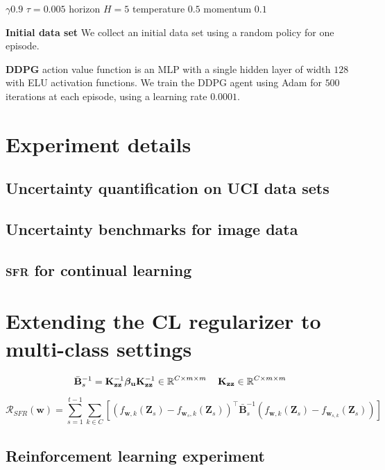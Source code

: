 \documentclass{article}
\newcommand{\our}{\textsc{sfr}\xspace}
\newcommand{\mathbold}[1]{\bm{#1}}
\newcommand{\mbf}[1]{\mathbf{#1}}
\newcommand{\MB}{\mbf{B}}
\newcommand{\MZ}{\mbf{Z}}
\newcommand{\T}{\top}
\newcommand{\vbeta}[0]{\mathbold{\beta}}
\newcommand{\vu}{\mbf{u}}
\newcommand{\vw}{\mbf{w}}
\newcommand{\MKzz}{\mbf{K}_{\mbf{z}\mbf{z}}}
\begin{document}
$\gamma 0.9$
$\tau=0.005$
horizon $H=5$
temperature $0.5$
momentum $0.1$

\textbf{Initial data set}
We collect an initial data set using a random policy for one episode.

\textbf{DDPG}
action value function is an MLP with a single hidden layer of width $128$ with ELU activation functions.
We train the DDPG agent using Adam for $500$ iterations at each episode, using a learning rate $0.0001$.




\section{Experiment details}
\label{app:experiments}


\subsection{Uncertainty quantification on UCI data sets}
\label{app:uci}



\subsection{Uncertainty benchmarks for image data}
\label{app:image}


\subsection{\our for continual learning}
\label{app:cl-experiment}
\section{Extending the CL regularizer to multi-class settings}
\label{sec:cl_multioutput}
\begin{equation}
	\bar{\MB}^{-1}_s = \MKzz^{-1} \vbeta_\vu \MKzz^{-1} \in \R^{C \times m \times m} \quad \MKzz \in \R^{C \times m \times m} 
\end{equation}

\begin{equation}
	\mathcal{R_\textit{SFR}}(\mathbf{w}) = \sum_{s=1}^{t-1}	\sum_{k \in 	C}\left[\left(f_{\vw, k}(\MZ_{s}) - f_{\vw_{s}, k}(\MZ_s) \right)^\T \bar{\MB}^{-1}_{s} \left(f_{\vw, k}(\MZ_{s}) - f_{\vw_{s, k}}(\MZ_s) \right) \right] 
\end{equation}


\subsection{Reinforcement learning experiment}
\label{app:rl-experiment}
\end{document}
